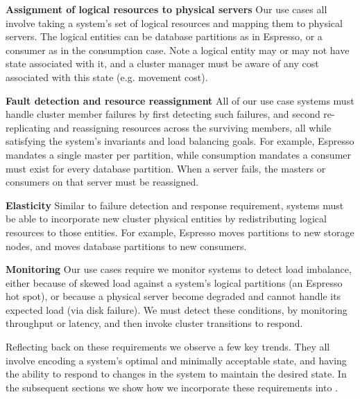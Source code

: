 \squishlist
\item \textbf{Assignment of logical resources to physical servers}
Our use cases all involve taking a system's set of logical resources and mapping
them to physical servers.  The logical entities can be database partitions as in
Espresso, or a consumer as in the \databus consumption case.  Note a logical
entity may or may not have state associated with it, and a cluster manager must
be aware of any cost associated with this state (e.g. movement cost).
\item \textbf{Fault detection and resource reassignment}
All of our use case systems must handle cluster member failures by first
detecting such failures, and second re-replicating and reassigning resources 
across the surviving members, all while satisfying the system's invariants and 
load balancing goals.  For example, Espresso mandates a single master per
partition, while \databus consumption mandates a consumer must exist for every
database partition.  When a server fails, the masters or consumers on that
server must be reassigned. 
\item \textbf{Elasticity} 
Similar to failure detection and response requirement, systems must be able to
incorporate new cluster physical entities by redistributing logical resources
to those entities.  For example, Espresso moves partitions to new storage nodes,
and \databus moves database partitions to new consumers.  
\item \textbf{Monitoring}
Our use cases require we monitor systems to detect load imbalance, either
because of skewed load against a system's logical partitions (\eg an Espresso
hot spot), or because a physical server become degraded and cannot
handle its expected load (\eg via disk failure).  We must detect these
conditions, \eg by monitoring throughput or latency, and then invoke cluster
transitions to respond.
\squishend
 
Reflecting back on these requirements we observe a few key trends.  They all
involve encoding a system's optimal and minimally acceptable state, and having the ability
to respond to changes in the system to maintain the desired state.  In the
subsequent sections we show how we incorporate these requirements into \helix. 

